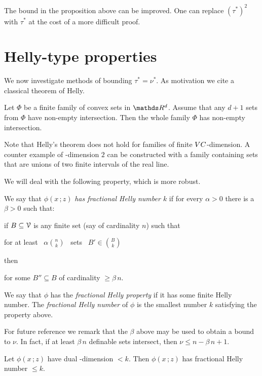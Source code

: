 \documentclass[scombinatorics.tex]{subfiles}
\begin{document}
The bound in the proposition above can be improved.
One can replace $(\tau^*)^2$ with  $\tau^*$ at the cost of a more difficult proof.

\section{Helly-type properties}

We now investigate methods of bounding $\tau^*=\nu^*$.
As motivation we cite a classical theorem of Helly.

\begin{proposition}
Let $\Phi$ be a finite family of convex sets in $\RR^d$.
Assume that any $d+1$ sets from $\Phi$ have non-empty intersection.
Then the whole family $\Phi$ has non-empty intersection.\QED
\end{proposition}

Note that Helly's theorem does not hold for families of finite ${\footnotesize VC}$-dimension.
A counter example of \vc-dimension $2$ can be constructed with a family containing sets that are unions of two finite intervals of the real line.

We will deal with the following property, which is more robust.

\begin{definition}
We say that $\phi(x\,;z)$ \emph{has fractional Helly number $k$\/} if for every $\alpha>0$ there is a $\beta>0$ such that:

if $B\subseteq\EuScript V$ is any finite set (say of cardinality $n$) such that

\hfill for at least \ $\displaystyle\alpha{n\choose k}$ \ sets \ $\displaystyle B'\in{B\choose k}$

then

\hfill for some $B''\subseteq B$ of cardinality $\ge\beta\,n$.

We say that $\phi$ has the \emph{fractional Helly property\/} if it has some finite Helly number.
The \emph{fractional Helly number\/} of $\phi$ is the smallest number $k$ satisfying the property above.\QED
\end{definition}

For future reference we remark that the $\beta$ above may be used to obtain a bound to $\nu$. In fact, if at least $\beta\,n$ definable sets intersect, then $\nu\le n-\beta\,n+1$.

\begin{theorem}[(Matou\v{s}ek)]
Let  $\phi(x\,;z)$ have dual \vc-dimension $<k$.
Then $\phi(x\,;z)$ has fractional Helly number $\le k$.
\end{theorem}
\end{document}

